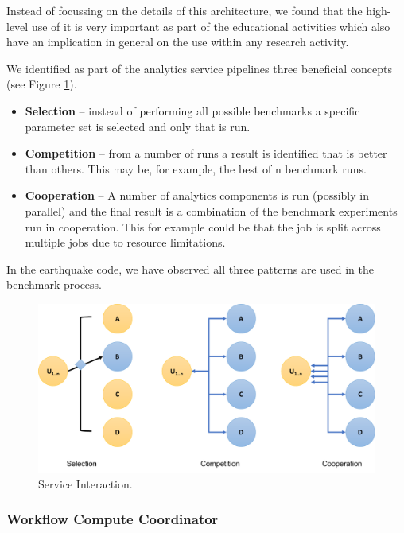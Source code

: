 \documentclass[utf8]{FrontiersinVancouver} %
\begin{document}
Instead of focussing on the details of this architecture, we found that
the high-level use of it is very important as part of the educational
activities which also have an implication in general on the use within
any research activity.

We identified as part of the  analytics service pipelines
three beneficial concepts (see Figure \ref{fig:service-interaction}).

\begin{itemize}
\item {\bf Selection} -- instead of performing all possible benchmarks a
  specific parameter set is selected and only that is run.  
\item {\bf Competition} -- from a number of runs a result is identified that is better than others. This
  may be, for example, the best of n benchmark runs.
\item {\bf Cooperation} -- A number of analytics components is run
  (possibly in parallel) and the final result is a combination of the
  benchmark experiments run in cooperation. This for example could be
  that the job is split across multiple jobs due to resource
  limitations.
\end{itemize}

In the earthquake code, we have observed all three patterns are used
in the benchmark process.

\begin{figure}[htb]
\centering\includegraphics[width=0.75\columnwidth]{images/processes-nist.pdf}
\caption{Service Interaction.}
\label{fig:service-interaction}
\end{figure}




\subsubsection{Workflow Compute Coordinator}
\label{sec:workflow-cc}

\end{document}
